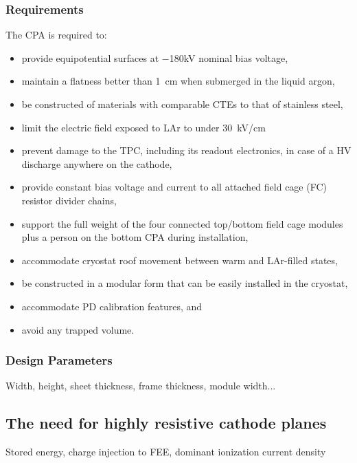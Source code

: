 \subsubsection{Requirements}
The CPA is required to:
\begin{itemize}
\item provide equipotential surfaces at $-$180kV nominal bias voltage,
\item maintain a flatness better than 1~cm when submerged in the liquid argon,
\item be constructed of materials with comparable CTEs to that of stainless steel, 
\item limit the electric field exposed to LAr to under 30~kV/cm 
\item prevent damage to the TPC, including its readout electronics, in case of a HV discharge anywhere on the cathode,
\item provide constant bias voltage and current to all attached field cage (FC) resistor divider chains,
\item support the full weight of the four connected top/bottom field cage modules plus a person on the bottom CPA during installation,
\item accommodate cryostat roof movement between warm and LAr-filled states,
\item be constructed in a modular form that can be easily installed in the cryostat,
\item accommodate PD calibration features, and
\item avoid any trapped volume.
\end{itemize}

\subsubsection{Design Parameters}

Width, height, sheet thickness, frame thickness, module width...

\subsection{The need for highly resistive cathode planes}
Stored energy, charge injection to FEE, dominant ionization current density

